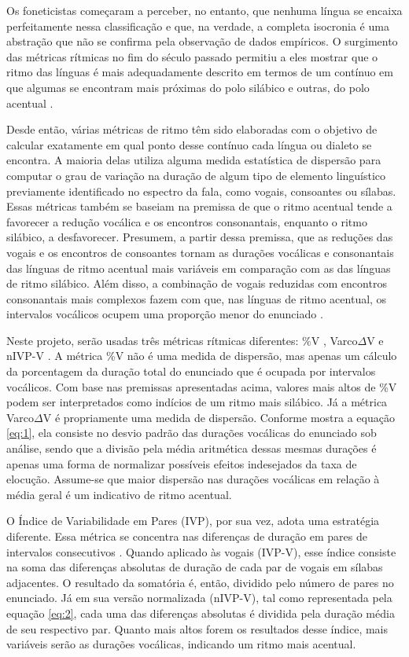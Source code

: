 \documentclass[a4paper, 12pt, article, oneside, brazil,leqno]{memoir}
\begin{document}
Os foneticistas começaram a perceber, no entanto, que nenhuma língua se encaixa perfeitamente nessa classificação e que, na verdade, a completa isocronia é uma abstração que não se confirma pela observação de dados empíricos. O surgimento das métricas rítmicas no fim do século passado permitiu a eles mostrar que o ritmo das línguas é mais adequadamente descrito em termos de um contínuo em que algumas se encontram mais próximas do polo silábico e outras, do polo acentual \cite{torgersen2012}.

Desde então, várias métricas de ritmo têm sido elaboradas com o objetivo de calcular exatamente em qual ponto desse contínuo cada língua ou dialeto se encontra. A maioria delas utiliza alguma medida estatística de dispersão para computar o grau de variação na duração de algum tipo de elemento linguístico previamente identificado no espectro da fala, como vogais, consoantes ou sílabas. Essas métricas também se baseiam na premissa de que o ritmo acentual tende a favorecer a redução vocálica e os encontros consonantais, enquanto o ritmo silábico, a desfavorecer. Presumem, a partir dessa premissa, que as reduções das vogais e os encontros de consoantes tornam as durações vocálicas e consonantais das línguas de ritmo acentual mais variáveis em comparação com as das línguas de ritmo silábico. Além disso, a combinação de vogais reduzidas com encontros consonantais mais complexos fazem com que, nas línguas de ritmo acentual, os intervalos vocálicos ocupem uma proporção menor do enunciado \cite{fuchs2016}.

Neste projeto, serão usadas três métricas rítmicas diferentes: \%V \cite{ramus1999}, Varco$\Delta$V \cite{white2007a} e nIVP-V \cite{grabe2002}. A métrica \%V \cite{ramus1999} não é uma medida de dispersão, mas apenas um cálculo da porcentagem da duração total do enunciado que é ocupada por intervalos vocálicos. Com base nas premissas apresentadas acima, valores mais altos de \%V podem ser interpretados como indícios de um ritmo mais silábico. Já a métrica Varco$\Delta$V \cite{white2007a} é propriamente uma medida de dispersão. Conforme mostra a equação \ref{eq:1}, ela consiste no desvio padrão das durações vocálicas do enunciado sob análise, sendo que a divisão pela média aritmética dessas mesmas durações é apenas uma forma de normalizar possíveis efeitos indesejados da taxa de elocução. Assume-se que maior dispersão nas durações vocálicas em relação à média geral é um indicativo de ritmo acentual.

O Índice de Variabilidade em Pares (IVP), por sua vez, adota uma estratégia diferente. Essa métrica se concentra nas diferenças de duração em pares de intervalos consecutivos \cite{grabe2002}. Quando aplicado às vogais (IVP-V), esse índice consiste na soma das diferenças absolutas de duração de cada par de vogais em sílabas adjacentes. O resultado da somatória é, então, dividido pelo número de pares no enunciado. Já em sua versão normalizada (nIVP-V), tal como representada pela equação \ref{eq:2}, cada uma das diferenças absolutas é dividida pela duração média de seu respectivo par. Quanto mais altos forem os resultados desse índice, mais variáveis serão as durações vocálicas, indicando um ritmo mais acentual.
\end{document}
